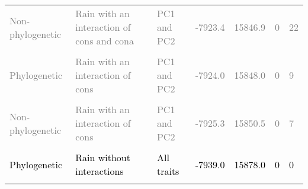 \documentclass[
  12pt,
  letterpaper,
  DIV=11,
  numbers=noendperiod]{scrartcl}
\begin{document}
\begin{table}[H]
{\begin{tabular}[t]{lllllll}
\textcolor{gray}{Non-phylogenetic} & \textcolor{gray}{Rain with an interaction of cons and cona} & \textcolor{gray}{PC1 and PC2} & \textcolor{gray}{-7923.4} & \textcolor{gray}{15846.9} & \textcolor{gray}{0} & \textcolor{gray}{22}\\
\cellcolor{gray!6}{\textcolor{gray}{Non-phylogenetic}} & \cellcolor{gray!6}{\textcolor{gray}{Rain with all the interactions}} & \cellcolor{gray!6}{\textcolor{gray}{PC1 and PC2}} & \cellcolor{gray!6}{\textcolor{gray}{-7923.6}} & \cellcolor{gray!6}{\textcolor{gray}{15847.3}} & \cellcolor{gray!6}{\textcolor{gray}{0}} & \cellcolor{gray!6}{\textcolor{gray}{5}}\\
\textcolor{gray}{Phylogenetic} & \textcolor{gray}{Rain with an interaction of cons} & \textcolor{gray}{PC1 and PC2} & \textcolor{gray}{-7924.0} & \textcolor{gray}{15848.0} & \textcolor{gray}{0} & \textcolor{gray}{9}\\
\addlinespace
\cellcolor{gray!6}{\textcolor{gray}{Non-phylogenetic}} & \cellcolor{gray!6}{\textcolor{gray}{No rain}} & \cellcolor{gray!6}{\textcolor{gray}{PC1 and PC2}} & \cellcolor{gray!6}{\textcolor{gray}{-7924.9}} & \cellcolor{gray!6}{\textcolor{gray}{15849.8}} & \cellcolor{gray!6}{\textcolor{gray}{0}} & \cellcolor{gray!6}{\textcolor{gray}{65}}\\
\textcolor{gray}{Non-phylogenetic} & \textcolor{gray}{Rain with an interaction of cons} & \textcolor{gray}{PC1 and PC2} & \textcolor{gray}{-7925.3} & \textcolor{gray}{15850.5} & \textcolor{gray}{0} & \textcolor{gray}{7}\\
\cellcolor{gray!6}{\textcolor{black}{Phylogenetic}} & \cellcolor{gray!6}{\textcolor{black}{No rain}} & \cellcolor{gray!6}{\textcolor{black}{All traits}} & \cellcolor{gray!6}{\textcolor{black}{-7938.6}} & \cellcolor{gray!6}{\textcolor{black}{15877.1}} & \cellcolor{gray!6}{\textcolor{black}{0}} & \cellcolor{gray!6}{\textcolor{black}{0}}\\
\textcolor{black}{Phylogenetic} & \textcolor{black}{Rain without interactions} & \textcolor{black}{All traits} & \textcolor{black}{-7939.0} & \textcolor{black}{15878.0} & \textcolor{black}{0} & \textcolor{black}{0}\\
\cellcolor{gray!6}{\textcolor{black}{Non-phylogenetic}} & \cellcolor{gray!6}{\textcolor{black}{No rain}} & \cellcolor{gray!6}{\textcolor{black}{All traits}} & \cellcolor{gray!6}{\textcolor{black}{-7939.2}} & \cellcolor{gray!6}{\textcolor{black}{15878.5}} & \cellcolor{gray!6}{\textcolor{black}{0}} & \cellcolor{gray!6}{\textcolor{black}{0}}\\

\end{tabular}}
\end{table}
\end{document}
